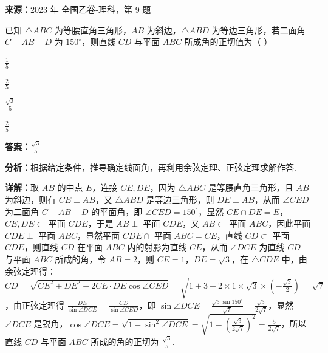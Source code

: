 \begin{question}[points=5]
\textbf{来源：}2023 年 全国乙卷-理科，第 9 题\par
已知 $\triangle ABC$ 为等腰直角三角形，$AB$ 为斜边，$\triangle ABD$ 为等边三角形，若二面角 $C-AB-D$ 为 $150^\circ$，则直线 $CD$ 与平面 $ABC$ 所成角的正切值为（ ）
\begin{choices}
  \item $\frac{1}{5}$
  \item $\frac{2}{5}$
  \item $\frac{\sqrt{3}}{5}$
  \item $\frac{2}{5}$
\end{choices}
\begin{solution}
\textbf{答案：}$\frac{\sqrt{3}}{5}$

\textbf{分析：}根据给定条件，推导确定线面角，再利用余弦定理、正弦定理求解作答.

\textbf{详解：}取 $AB$ 的中点 $E$，连接 $CE,DE$，因为 $\triangle ABC$ 是等腰直角三角形，且 $AB$ 为斜边，则有 $CE\perp AB$，又 $\triangle ABD$ 是等边三角形，则 $DE\perp AB$，从而 $\angle CED$ 为二面角 $C-AB-D$ 的平面角，即 $\angle CED=150^\circ$，显然 $CE\cap DE=E$，$CE,DE\subset$ 平面 $CDE$，于是 $AB\perp$ 平面 $CDE$，又 $AB\subset$ 平面 $ABC$，因此平面 $CDE\perp$ 平面 $ABC$，显然平面 $CDE\cap$ 平面 $ABC=CE$，直线 $CD\subset$ 平面 $CDE$，则直线 $CD$ 在平面 $ABC$ 内的射影为直线 $CE$，从而 $\angle DCE$ 为直线 $CD$ 与平面 $ABC$ 所成的角，令 $AB=2$，则 $CE=1$，$DE=\sqrt{3}$，在 $\triangle CDE$ 中，由余弦定理得：$CD=\sqrt{CE^2+DE^2-2CE\cdot DE\cos\angle CED}=\sqrt{1+3-2\times1\times\sqrt{3}\times(-\frac{\sqrt{3}}{2})}=\sqrt{7}$，由正弦定理得 $\frac{DE}{\sin\angle DCE}=\frac{CD}{\sin\angle CED}$，即 $\sin\angle DCE=\frac{\sqrt{3}\sin150^\circ}{\sqrt{7}}=\frac{\sqrt{3}}{2\sqrt{7}}$，显然 $\angle DCE$ 是锐角，$\cos\angle DCE=\sqrt{1-\sin^2\angle DCE}=\sqrt{1-(\frac{\sqrt{3}}{2\sqrt{7}})^2}=\frac{5}{2\sqrt{7}}$，所以直线 $CD$ 与平面 $ABC$ 所成的角的正切为 $\frac{\sqrt{3}}{5}$.
\end{solution}
\end{question}

